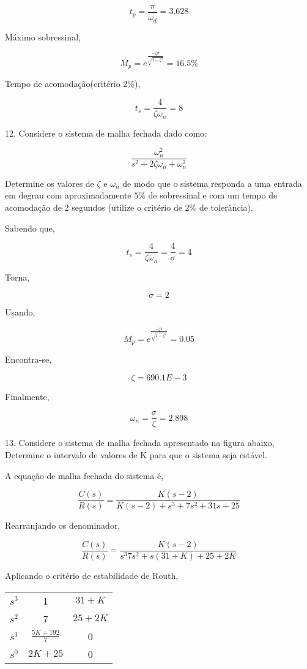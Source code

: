 \documentclass[paper=a4, fontsize=11pt]{article}
\begin{document}
$$
t_p = \frac{\pi}{\omega_d} = 3.628
$$

Máximo sobressinal,

$$
M_p = e^{\frac{-\zeta \pi}{\sqrt{1-\zeta^2}} } = 16.5 \%
$$

Tempo de acomodação(critério $2\%$),

$$
t_s = \frac{4}{\zeta \omega_n} = 8
$$


\newpage

12. Considere o sistema de malha fechada dado como:

$$
\frac{\omega_n^2}{s^2 + 2 \zeta \omega_n + \omega_n^2}
$$

Determine os valores de $\zeta$ e $\omega_n$ de modo que o sistema responda a uma entrada em degrau
com aproximadamente $5\%$ de sobressinal e com um tempo de acomodação de 2 segundos
(utilize o critério de $2\%$ de tolerância).

Sabendo que,

$$
t_s = \frac{4}{\zeta \omega_n} = \frac{4}{\sigma} = 4
$$

Torna,

$$
\sigma = 2
$$

Usando,

$$
M_p = e^{\frac{-\zeta \pi}{\sqrt{1-\zeta^2}} } = 0.05
$$

Encontra-se,

$$
\zeta = 690.1E-3
$$

Finalmente,

$$
\omega_n = \frac{\sigma}{\zeta} = 2.898
$$

\newpage

13. Considere o sistema de malha fechada apresentado na figura abaixo,
Determine o intervalo de valores de K para que o sistema seja estável.

A equação de malha fechada do sistema é,

$$
\frac{C(s)}{R(s)} = \frac{K (s-2)}{K (s-2) + s^3 + 7 s^2 + 31 s + 25}
$$

Rearranjando os denominador,

$$
\frac{C(s)}{R(s)} = \frac{K (s-2)}{s^3 7 s^2 + s(31 + K) + 25 + 2K} 
$$

Aplicando o critério de estabilidade de Routh,

\begin{center}
    \begin{tabular}{c| c c}
        $s^3$ & 1 & $31+K$ \\
        $s^2$ & 7 & $25+2K$ \\
        $s^1$ & $\frac{5K+192}{7}$ & 0 \\
        $s^0$ & $2K+25$ & 0 \\
    \end{tabular}
\end{center}
\end{document}
